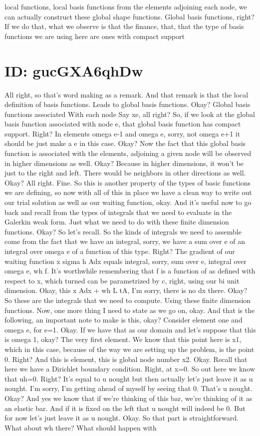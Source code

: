 \documentclass[10pt]{article}
\begin{document}
local functions, local basis functions from the elements adjoining each node, we can actually construct these global shape functions. Global basis functions, right? If we do that, what we observe is that the finance, that, that the type of basis functions we are using here are ones with compact support

\section*{ID: gucGXA6qhDw}
All right, so that's word making as a remark. And that remark is that the local definition of basis functions. Leads to global basis functions. Okay? Global basis functions associated With each node Say xe, all right? So, if we look at the global basis function associated with node e, that global basis function has compact support. Right? In elements omega e-1 and omega e, sorry, not omega e+1 it should be just make a e in this case. Okay? Now the fact that this global basis function is associated with the elements, adjoining a given node will be observed in higher dimensions as well. Okay? Because in higher dimensions, it won't be just to the right and left. There would be neighbors in other directions as well. Okay? All right. Fine. So this is another property of the types of basic functions we are defining, so now with all of this in place we have a clean way to write out our trial solution as well as our waiting function, okay. And it's useful now to go back and recall from the types of integrals that we need to evaluate in the Galerkin weak form. Just what we need to do with these finite dimension functions. Okay? So let's recall. So the kinds of integrals we need to assemble come from the fact that we have an integral, sorry, we have a sum over e of an integral over omega e of a function of this type. Right? The gradient of our waiting function x sigma h Adx equals integral, sorry, sum over e, integral over omega e, wh f. It's worthwhile remembering that f is a function of as defined with respect to x, which turned can be parametrized by c, right, using our bi unit dimension. Okay, this x Adx + wh L tA, I'm sorry, there is no dx there. Okay? So these are the integrals that we need to compute. Using these finite dimension functions. Now, one more thing I need to state as we go on, okay. And that is the following, an important note to make is this, okay? Consider element one and omega e, for e=1. Okay. If we have that as our domain and let's suppose that this is omega 1, okay? The very first element. We know that this point here is x1, which in this case, because of the way we are setting up the problem, is the point 0. Right? And this is element, this is global node number x2. Okay. Recall that here we have a Dirichlet boundary condition. Right, at x=0. So out here we know that uh=0. Right? It's equal to u nought but then actually let's just leave it as u nought. I'm sorry, I'm getting ahead of myself by seeing that 0. That's u nought. Okay? And yes we know that if we're thinking of this bar, we're thinking of it as an elastic bar. And if it is fixed on the left that u nought will indeed be 0. But for now let's just leave it as u nought. Okay. So that part is straightforward. What about wh there? What should happen with 
\end{document}
